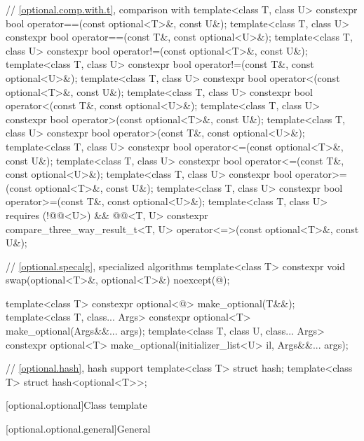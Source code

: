 \begin{codeblock}
{  // \ref{optional.comp.with.t}, comparison with 
  template<class T, class U> constexpr bool operator==(const optional<T>&, const U&);
  template<class T, class U> constexpr bool operator==(const T&, const optional<U>&);
  template<class T, class U> constexpr bool operator!=(const optional<T>&, const U&);
  template<class T, class U> constexpr bool operator!=(const T&, const optional<U>&);
  template<class T, class U> constexpr bool operator<(const optional<T>&, const U&);
  template<class T, class U> constexpr bool operator<(const T&, const optional<U>&);
  template<class T, class U> constexpr bool operator>(const optional<T>&, const U&);
  template<class T, class U> constexpr bool operator>(const T&, const optional<U>&);
  template<class T, class U> constexpr bool operator<=(const optional<T>&, const U&);
  template<class T, class U> constexpr bool operator<=(const T&, const optional<U>&);
  template<class T, class U> constexpr bool operator>=(const optional<T>&, const U&);
  template<class T, class U> constexpr bool operator>=(const T&, const optional<U>&);
  template<class T, class U>
      requires (!@@<U>) && @@<T, U>
    constexpr compare_three_way_result_t<T, U>
      operator<=>(const optional<T>&, const U&);

  // \ref{optional.specalg}, specialized algorithms
  template<class T>
    constexpr void swap(optional<T>&, optional<T>&) noexcept(@\seebelow@);

  template<class T>
    constexpr optional<@\seebelow@> make_optional(T&&);
  template<class T, class... Args>
    constexpr optional<T> make_optional(Args&&... args);
  template<class T, class U, class... Args>
    constexpr optional<T> make_optional(initializer_list<U> il, Args&&... args);

  // \ref{optional.hash}, hash support
  template<class T> struct hash;
  template<class T> struct hash<optional<T>>;
}
\end{codeblock}

[optional.optional]{Class template }

[optional.optional.general]{General}

